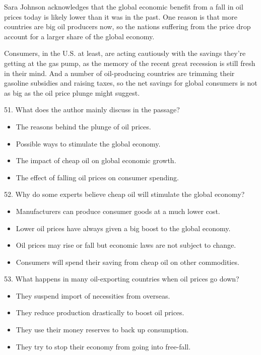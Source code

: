 \documentclass[UTF8,11pt]{ctexart}
\begin{document}
Sara Johnson acknowledges that the global economic benefit from a fall in oil prices today is likely lower than it was in the past. One reason is that more countries are big oil producers now, so the nations suffering from the price drop account for a larger share of the global economy.


Consumers, in the U.S. at least, are acting cautiously with the savings they're getting at the gas pump, as the memory of the recent great recession is still fresh in their mind. And a number of oil-producing countries are trimming their gasoline subsidies and raising taxes, so the net savings for global consumers is not as big as the oil price plunge might suggest.


51. What does the author mainly discuss in the passage?


\begin{itemize}[leftmargin=2em,itemsep=.2em,topsep=.4em]\item[A.] The reasons behind the plunge of oil prices.
\item[B.] Possible ways to stimulate the global economy.
\item[C.] The impact of cheap oil on global economic growth.
\item[D.] The effect of falling oil prices on consumer spending.
\end{itemize}

52. Why do some experts believe cheap oil will stimulate the global economy?


\begin{itemize}[leftmargin=2em,itemsep=.2em,topsep=.4em]\item[A.] Manufacturers can produce consumer goods at a much lower cost.
\item[B.] Lower oil prices have always given a big boost to the global economy.
\end{itemize}

\begin{itemize}[leftmargin=2em,itemsep=.2em,topsep=.4em]\item[C.] Oil prices may rise or fall but economic laws are not subject to change.
\item[D.] Consumers will spend their saving from cheap oil on other commodities.
\end{itemize}

53. What happens in many oil-exporting countries when oil prices go down?


\begin{itemize}[leftmargin=2em,itemsep=.2em,topsep=.4em]\item[A.] They suspend import of necessities from overseas.
\item[B.] They reduce production drastically to boost oil prices.
\item[C.] They use their money reserves to back up consumption.
\item[D.] They try to stop their economy from going into free-fall.
\end{itemize}
\end{document}
